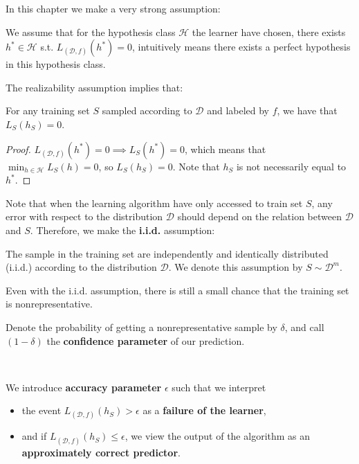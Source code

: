 In this chapter we make a very strong assumption:
\begin{definition}
We assume that for the hypothesis class $\mathcal{H}$ the learner have chosen, there exists $h^{*} \in \mathcal{H}$ s.t. $L_{(\mathcal{D},f)}(h^{*}) = 0$, intuitively means there exists a perfect hypothesis in this hypothesis class.
\end{definition}
The realizability assumption implies that:
\begin{corollary}
For any training set $S$ sampled according to $\mathcal{D}$ and labeled by $f$, we have that $L_S(h_S) = 0$.
\end{corollary}
\begin{proof}
$L_{(\mathcal{D},f)}(h^{*}) = 0 \implies L_S(h^{*}) = 0$, which means that $\min_{h \in \mathcal{H}} L_S(h) = 0$, so $L_S(h_S) = 0$. Note that $h_S$ is not necessarily equal to $h^{*}$.
\end{proof}


\begin{observe}
    Note that when the learning algorithm have only accessed to train set $S$, any error with respect to the distribution $\mathcal{D}$ should depend on the relation between $\mathcal{D}$ and $S$. Therefore, we make the \textbf{i.i.d.} assumption:
\end{observe}
\begin{definition}
The sample in the training set are independently and identically distributed (i.i.d.) according to the distribution $\mathcal{D}$. We denote this assumption by $S \sim \mathcal{D}^m$.
\end{definition}

\begin{observe}
    Even with the i.i.d. assumption, there is still a small chance that the training set is nonrepresentative.
\end{observe}

\begin{definition}
Denote the probability of getting a nonrepresentative sample by $\delta$, and call $(1-\delta)$ the \textbf{confidence parameter} of our prediction. 
\end{definition}

\begin{definition} ~

We introduce \textbf{accuracy parameter} $\epsilon$ such that we interpret
\begin{itemize}
    \item the event $L_{(\mathcal{D},f)}(h_S) > \epsilon$ as a \textbf{failure of the learner},
    \item and if $L_{(\mathcal{D},f)}(h_S) \le \epsilon$, we view the output of the algorithm as an \textbf{approximately correct predictor}.
\end{itemize}
\end{definition}

